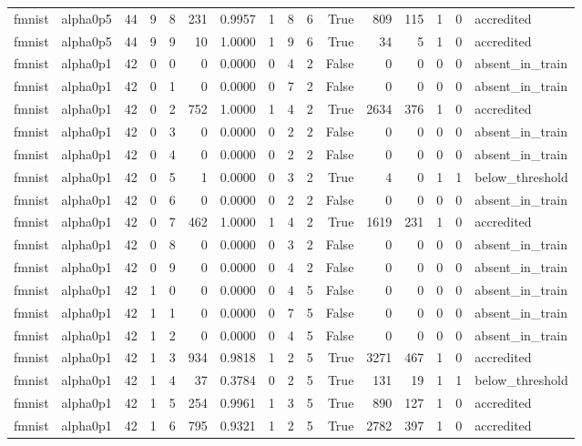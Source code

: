 \begin{tabular}{llrrrrrrrrrrrrrl}
fmnist & alpha0p5 & 44 & 9 & 8 & 231 & 0.9957 & 1 & 8 & 6 & True & 809 & 115 & 1 & 0 & accredited \\
fmnist & alpha0p5 & 44 & 9 & 9 & 10 & 1.0000 & 1 & 9 & 6 & True & 34 & 5 & 1 & 0 & accredited \\
fmnist & alpha0p1 & 42 & 0 & 0 & 0 & 0.0000 & 0 & 4 & 2 & False & 0 & 0 & 0 & 0 & absent\_in\_train \\
fmnist & alpha0p1 & 42 & 0 & 1 & 0 & 0.0000 & 0 & 7 & 2 & False & 0 & 0 & 0 & 0 & absent\_in\_train \\
fmnist & alpha0p1 & 42 & 0 & 2 & 752 & 1.0000 & 1 & 4 & 2 & True & 2634 & 376 & 1 & 0 & accredited \\
fmnist & alpha0p1 & 42 & 0 & 3 & 0 & 0.0000 & 0 & 2 & 2 & False & 0 & 0 & 0 & 0 & absent\_in\_train \\
fmnist & alpha0p1 & 42 & 0 & 4 & 0 & 0.0000 & 0 & 2 & 2 & False & 0 & 0 & 0 & 0 & absent\_in\_train \\
fmnist & alpha0p1 & 42 & 0 & 5 & 1 & 0.0000 & 0 & 3 & 2 & True & 4 & 0 & 1 & 1 & below\_threshold \\
fmnist & alpha0p1 & 42 & 0 & 6 & 0 & 0.0000 & 0 & 2 & 2 & False & 0 & 0 & 0 & 0 & absent\_in\_train \\
fmnist & alpha0p1 & 42 & 0 & 7 & 462 & 1.0000 & 1 & 4 & 2 & True & 1619 & 231 & 1 & 0 & accredited \\
fmnist & alpha0p1 & 42 & 0 & 8 & 0 & 0.0000 & 0 & 3 & 2 & False & 0 & 0 & 0 & 0 & absent\_in\_train \\
fmnist & alpha0p1 & 42 & 0 & 9 & 0 & 0.0000 & 0 & 4 & 2 & False & 0 & 0 & 0 & 0 & absent\_in\_train \\
fmnist & alpha0p1 & 42 & 1 & 0 & 0 & 0.0000 & 0 & 4 & 5 & False & 0 & 0 & 0 & 0 & absent\_in\_train \\
fmnist & alpha0p1 & 42 & 1 & 1 & 0 & 0.0000 & 0 & 7 & 5 & False & 0 & 0 & 0 & 0 & absent\_in\_train \\
fmnist & alpha0p1 & 42 & 1 & 2 & 0 & 0.0000 & 0 & 4 & 5 & False & 0 & 0 & 0 & 0 & absent\_in\_train \\
fmnist & alpha0p1 & 42 & 1 & 3 & 934 & 0.9818 & 1 & 2 & 5 & True & 3271 & 467 & 1 & 0 & accredited \\
fmnist & alpha0p1 & 42 & 1 & 4 & 37 & 0.3784 & 0 & 2 & 5 & True & 131 & 19 & 1 & 1 & below\_threshold \\
fmnist & alpha0p1 & 42 & 1 & 5 & 254 & 0.9961 & 1 & 3 & 5 & True & 890 & 127 & 1 & 0 & accredited \\
fmnist & alpha0p1 & 42 & 1 & 6 & 795 & 0.9321 & 1 & 2 & 5 & True & 2782 & 397 & 1 & 0 & accredited \\

\end{tabular}
